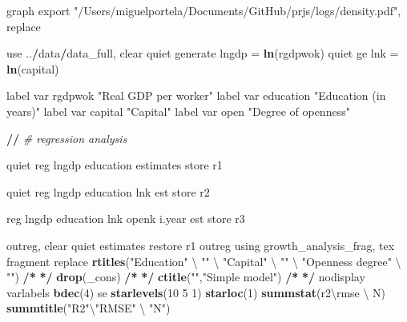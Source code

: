 \documentclass[
  12pt,
]{article}
\newenvironment{Shaded}{\begin{snugshade}}{\end{snugshade}}
\newcommand{\CommentTok}[1]{\textcolor[rgb]{0.56,0.35,0.01}{\textit{#1}}}
\newcommand{\DecValTok}[1]{\textcolor[rgb]{0.00,0.00,0.81}{#1}}
\newcommand{\ErrorTok}[1]{\textcolor[rgb]{0.64,0.00,0.00}{\textbf{#1}}}
\newcommand{\KeywordTok}[1]{\textcolor[rgb]{0.13,0.29,0.53}{\textbf{#1}}}
\newcommand{\NormalTok}[1]{#1}
\newcommand{\OperatorTok}[1]{\textcolor[rgb]{0.81,0.36,0.00}{\textbf{#1}}}
\newcommand{\StringTok}[1]{\textcolor[rgb]{0.31,0.60,0.02}{#1}}
\begin{document}
\begin{Shaded}
\begin{Highlighting}[]
{\NormalTok{graph export }\StringTok{"/Users/miguelportela/Documents/GitHub/prjs/logs/density.pdf"}\NormalTok{, replace}

\NormalTok{use ..}\OperatorTok{/}\NormalTok{data}\OperatorTok{/}\NormalTok{data_full, clear}
\NormalTok{        quiet generate lngdp =}\StringTok{ }\KeywordTok{ln}\NormalTok{(rgdpwok)}
\NormalTok{        quiet ge lnk =}\StringTok{ }\KeywordTok{ln}\NormalTok{(capital)}

\NormalTok{        label var rgdpwok }\StringTok{"Real GDP per worker"}
\NormalTok{        label var education }\StringTok{"Education (in years)"}
\NormalTok{        label var capital }\StringTok{"Capital"}
\NormalTok{        label var open }\StringTok{"Degree of openness"}

\OperatorTok{/}\ErrorTok{/}\StringTok{ }\CommentTok{# regression analysis}

\StringTok{    }\NormalTok{quiet reg lngdp education}
\NormalTok{        estimates store r1}

\NormalTok{    quiet reg lngdp education lnk}
\NormalTok{        est store r2}

\NormalTok{    reg lngdp education lnk openk i.year}
\NormalTok{        est store r3}

\NormalTok{outreg, clear}
\NormalTok{    quiet estimates restore r1}
\NormalTok{        outreg using growth_analysis_frag, tex fragment replace }\KeywordTok{rtitles}\NormalTok{(}\StringTok{"Education"}\NormalTok{ \textbackslash{} }\StringTok{""}\NormalTok{ \textbackslash{} }\StringTok{"Capital"}\NormalTok{ \textbackslash{} }\StringTok{""}\NormalTok{ \textbackslash{} }\StringTok{"Openness degree"}\NormalTok{ \textbackslash{} }\StringTok{""}\NormalTok{)  }\OperatorTok{/}\ErrorTok{*}
\StringTok{                }\ErrorTok{*/}\StringTok{ }\KeywordTok{drop}\NormalTok{(_cons) }\OperatorTok{/}\ErrorTok{*}
\StringTok{                }\ErrorTok{*/}\StringTok{ }\KeywordTok{ctitle}\NormalTok{(}\StringTok{""}\NormalTok{,}\StringTok{"Simple model"}\NormalTok{) }\OperatorTok{/}\ErrorTok{*}
\StringTok{                }\ErrorTok{*/}\StringTok{ }\NormalTok{nodisplay varlabels }\KeywordTok{bdec}\NormalTok{(}\DecValTok{4}\NormalTok{) se }\KeywordTok{starlevels}\NormalTok{(}\DecValTok{10} \DecValTok{5} \DecValTok{1}\NormalTok{) }\KeywordTok{starloc}\NormalTok{(}\DecValTok{1}\NormalTok{) }\KeywordTok{summstat}\NormalTok{(r2\textbackslash{}rmse \textbackslash{} N) }\KeywordTok{summtitle}\NormalTok{(}\StringTok{"R2"}\NormalTok{\textbackslash{}}\StringTok{"RMSE"}\NormalTok{ \textbackslash{} }\StringTok{"N"}\NormalTok{)}

}
\end{Highlighting}
\end{Shaded}
\end{document}
